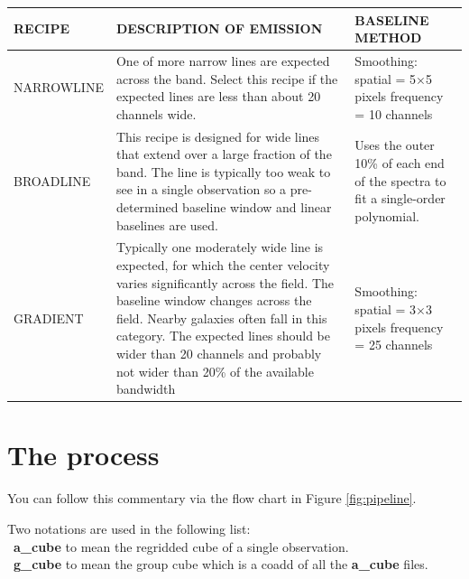 \documentclass[11pt,oneside,chapters]{starlink}
\begin{document}
\begin{table}[h!]
\begin{tabular}{p{2.9cm}|p{7.3cm}|p{4.5cm}}
\hline
\textbf{RECIPE} & \textbf{DESCRIPTION OF EMISSION} & \textbf{BASELINE METHOD} \\
\hline
NARROWLINE & One of more narrow lines are expected across the band.
Select this recipe if the expected lines are less than about 20
channels wide.& Smoothing: \newline spatial = 5$\times$5 pixels
\newline frequency = 10 channels\\
\hline
BROADLINE &This recipe is designed for wide lines that extend over a
large fraction of the band. The line is typically too weak to see in a
single observation so a pre-determined baseline window and linear
baselines are used.  &Uses the outer 10\% of each end of the spectra
to fit a single-order polynomial.  \\
\hline
GRADIENT &Typically one moderately wide line is expected, for which
the center velocity varies significantly across the field. The
baseline window changes across the field. Nearby galaxies often fall
in this category. The expected lines should be wider than 20 channels
and probably not wider than 20\% of the available bandwidth &
Smoothing: \newline spatial = 3$\times$3 pixels \newline frequency =
25 channels\\
\hline
\end{tabular}
\end{table}

\section{The process}
You can follow this commentary via the flow chart in Figure \ref{fig:pipeline}.

Two notations are used in the following list:\\
\textbullet\ \textbf{a\_cube} to mean the regridded cube of a single
observation. \\
\textbullet\ \textbf{g\_cube} to mean the group cube which is a coadd
of all the \textbf{a\_cube} files.
\end{document}
